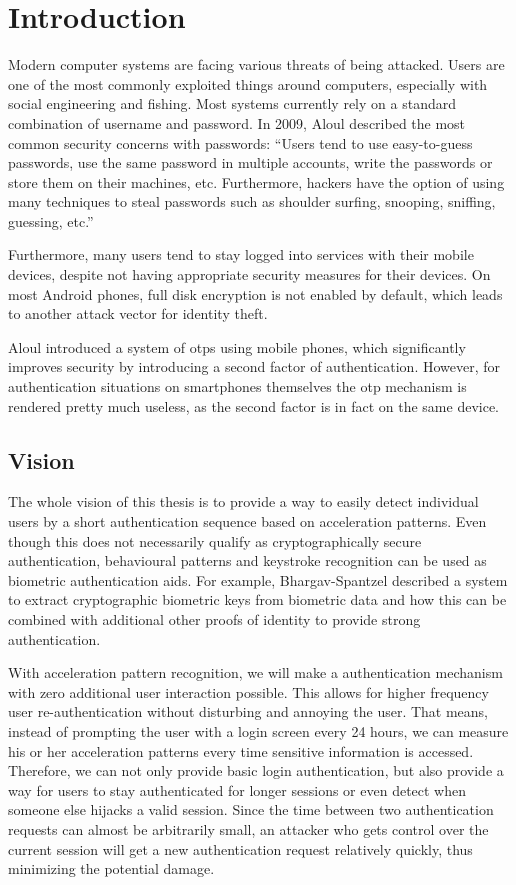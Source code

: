 \chapter{Introduction}\label{chapter:introduction}
Modern computer systems are facing various threats of being attacked. Users are one of the most commonly exploited things around computers, especially with social engineering and fishing. Most systems currently rely on a standard combination of username and password. In 2009, Aloul \etal described the most common security concerns with passwords:\cite{aloul2009two}
``Users tend to use easy-to-guess passwords, use the same password in multiple accounts, write the passwords or store them on their machines, etc. Furthermore, hackers have the option of using many techniques to steal passwords such as shoulder surfing, snooping, sniffing, guessing, etc.''

Furthermore, many users tend to stay logged into services with their mobile devices, despite not having appropriate security measures for their devices. On most Android phones, full disk encryption is not enabled by default, which leads to another attack vector for identity theft.

Aloul \etal introduced a system of \glspl{otp} using mobile phones, which significantly improves security by introducing a second factor of authentication. However, for authentication situations on smartphones themselves the \gls{otp} mechanism is rendered pretty much useless, as the second factor is in fact on the same device.

\section{Vision}
The whole vision of this thesis is to provide a way to easily detect individual users by a short authentication sequence based on acceleration patterns. Even though this does not necessarily qualify as cryptographically secure authentication, behavioural patterns and keystroke recognition can be used as biometric authentication aids. For example, Bhargav-Spantzel \etal \cite{bhargav2006privacy} described a system to extract cryptographic biometric keys from biometric data and how this can be combined with additional other proofs of identity to provide strong authentication.

With acceleration pattern recognition, we will make a authentication mechanism with zero additional user interaction possible. This allows for higher frequency user re-authentication without disturbing and annoying the user. That means, instead of prompting the user with a login screen every 24 hours, we can measure his or her acceleration patterns every time sensitive information is accessed. Therefore, we can not only provide basic login authentication, but also provide a way for users to stay authenticated for longer sessions or even detect when someone else hijacks a valid session. Since the time between two authentication requests can almost be arbitrarily small, an attacker who gets control over the current session will get a new authentication request relatively quickly, thus minimizing the potential damage.
